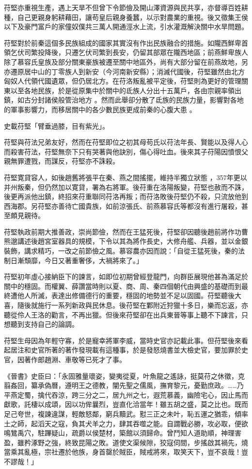 苻堅亦重視生產，遇上天旱不但曾下令節儉及開山澤資源與民共享，亦督導百姓耕種，自己更親身躬耕藉田，讓苟皇后親身養蠶，以示對農業的重視。後又徵集王侯以下及豪門富戶的家僮奴僕共三萬人開通涇水上流，引水灌溉解決關中水旱問題。

苻堅對於前秦這個多民族組成的國家其實沒有作出民族融合的措施。如隴西鮮卑首領乞伏司繁投降後，只遷乞伏司繁到長安，仍留其部眾在隴西地區；前燕鮮卑族人除了慕容氏皇族及部分關東豪族被遷至關中地區外，尚有大部分留在前燕故地，另亦遷原居中山的丁零族人到新安（今河南新安縣）；消滅代國後，苻堅雖然由北方匈奴人代領代國遺眾，但仍居北方。在苻洛叛亂被平定後，苻堅則為更好的管理關東以至各地民族，於是從原集中於關中的氐族人分出十五萬戶，各由宗親率領出鎮，如古分封諸侯般管治地方 。然而此舉卻分散了氐族的民族力量，影響對各地的軍事影響力，而移居關中的各少數民族更成前秦的心腹大患 。

史載苻堅「臂垂過膝，目有紫光」。

苻堅與苻法兄弟友好，然而在苻堅即位之初其母苟氏以苻法年長、賢能以及得人心而殺害苻法，苻堅無奈下只有哭著與他訣別，傷心得吐血。後來其子苻陽因憤恨父親無罪遭戮，而謀反，苻堅亦不誅殺。

苻堅寛貸容人，如後趙舊將張平在秦、燕之間搖擺，維持半獨立狀態 ，357年更以并州叛秦，但仍然加以寛貸，署為右將軍。後苻重在洛陽叛變，苻堅也赦而不誅，後更再派他出鎮，終招來苻重聯同苻洛再叛；而苻洛敗後苻堅仍不殺，只流放他到西海郡。另苻堅亦善待亡國貴族，如前涼張氏、前燕慕容氏等都沒有進行屠殺，甚至頗見親待。

苻堅執政前期大推善政，崇尚節儉，然而在王猛死後，苻堅卻因聽後趙前將作功曹熊邈講述後趙宮室器具的規模，下令以其為將作長史，大修舟艦、兵器，並以金銀裝飾，講求精巧，一改之前節儉之風。慕容農亦因而說：「自從王猛死後，秦的法制日漸頹靡，今日又著重奢侈，大禍將來了。」

苻堅初年虛心接納臣下的諫言，如即位初期曾經登龍門，向群臣展現他甚為滿足於關中的穩固。而權翼、薛讚當時則以夏、商、周、秦四個朝代由興盛的基礎而到最終遭他人所滅，表達出修備德行的重要，穩固的地勢並不足以固國。苻堅聽後大喜，隨後就施行一系列新政與民休息。後苻堅在鄴附近狩獵十多日，樂而忘返，亦聽從伶人王洛的勸言，不再出獵。但後來苻堅卻在出兵東晉等事上聽不下諫言，只想聽到支持自己的論調。

苻堅生母因為年輕守寡，於是寵幸將軍李威，當時史官亦記載此事。但苻堅後來看起居注和史官所著的著作發現載有這種事，於是發怒燒書並大檢史官，要加罪於史官，因著作郎趙淵、車敬等已死才了事。

《晉書》史臣曰：「永固雅量瓌姿，變夷從夏，叶魚龍之遙詠，挺莫苻之休徵，克翦姦回，纂承偽曆，遵明王之德教，闡先聖之儒風，撫育黎元，憂勤庶政。……乃平燕定蜀，擒代吞涼，跨三分之二，居九州之七，遐荒慕義，幽險宅心，因止馬而獻歌，託棲以成頌，因以功侔曩烈，豈直化洽當年！雖五胡之盛，莫之比也。既而足己夸世，複諫違謀，輕敵怒鄰，窮兵黷武。懟三正之未叶，恥五運之猶乖，傾率土之師，起滔天之寇，負其犬羊之力，肆其吞噬之能。自謂戰必勝，攻必取，便欲鳴鷥禹穴，駐蹕疑山，疏爵以侯楚材，築館以須歸命。曾鬥知人道助順，神理害盈，雖矜涿野之強，終致昆陽之敗。道使文渠候隙，狡寇伺間，步搖啟其禍先，燒當乘其亂極，宗社遷於他族，身首罄於賊臣，賊戒將來，取笑天下，豈不哀哉！豈不謬哉！」

